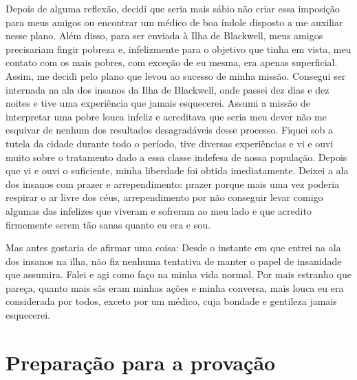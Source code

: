 Depois
de alguma reflexão, decidi que seria mais sábio não criar essa imposição
para meus amigos ou encontrar um médico de boa índole disposto a me
auxiliar nesse plano. Além disso, para ser enviada à Ilha de Blackwell,
meus amigos precisariam fingir pobreza e, infelizmente para o objetivo
que tinha em vista, meu contato com os mais pobres, com exceção de eu
mesma, era apenas superficial. Assim, me decidi pelo plano que levou ao
sucesso de minha missão. Consegui ser internada na ala dos insanos da
Ilha de Blackwell, onde passei dez dias e dez noites e tive uma
experiência que jamais esquecerei. Assumi a missão de interpretar uma
pobre louca infeliz e acreditava que seria meu dever não me esquivar de
nenhum dos resultados desagradáveis desse processo. Fiquei sob a tutela
da cidade durante todo o período, tive diversas experiências e vi e ouvi
muito sobre o tratamento dado a essa classe indefesa de nossa população.
Depois que vi e ouvi o suficiente, minha liberdade foi obtida
imediatamente. Deixei a ala dos insanos com prazer e arrependimento:
prazer porque mais uma vez poderia respirar o ar livre dos céus,
arrependimento por não conseguir levar comigo algumas das infelizes que
viveram e sofreram ao meu lado e que acredito firmemente serem tão sanas
quanto eu era e sou.

Mas antes gostaria de afirmar uma coisa: Desde o instante em que entrei
na ala dos insanos na ilha, não fiz nenhuma tentativa de manter o papel
de insanidade que assumira. Falei e agi como faço na minha vida normal.
Por mais estranho que pareça, quanto mais sãs eram minhas ações e minha
conversa, mais louca eu era considerada por todos, exceto por um médico,
cuja bondade e gentileza jamais esquecerei.


\chapter{Preparação para a
provação}\label{capuxedtulo-ii-preparauxe7uxe3o-para-a-provauxe7uxe3o}

